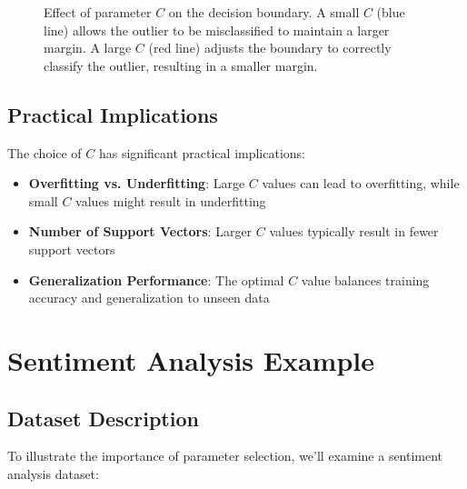 \documentclass{article}
\begin{document}
\begin{figure}[h]
\centering
{}
\caption{Effect of parameter $C$ on the decision boundary. A small $C$ (blue line) allows the outlier to be misclassified to maintain a larger margin. A large $C$ (red line) adjusts the boundary to correctly classify the outlier, resulting in a smaller margin.}
\end{figure}

\subsection{Practical Implications}
The choice of $C$ has significant practical implications:

\begin{itemize}
    \item \textbf{Overfitting vs. Underfitting}: Large $C$ values can lead to overfitting, while small $C$ values might result in underfitting
    \item \textbf{Number of Support Vectors}: Larger $C$ values typically result in fewer support vectors
    \item \textbf{Generalization Performance}: The optimal $C$ value balances training accuracy and generalization to unseen data
\end{itemize}

\section{Sentiment Analysis Example}

\subsection{Dataset Description}
To illustrate the importance of parameter selection, we'll examine a sentiment analysis dataset:
\end{document}

